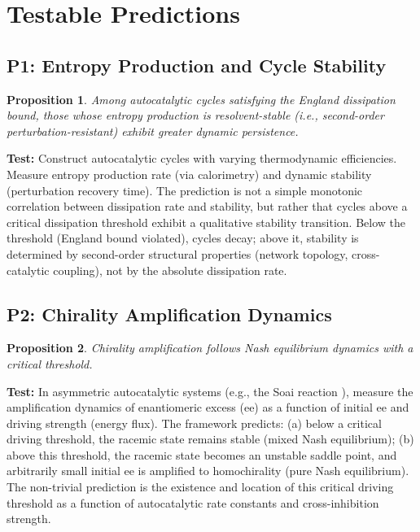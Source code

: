 \documentclass[12pt,a4paper]{article}
\newtheorem{proposition}{Proposition}
\theoremstyle{remark}
\begin{document}
\section{Testable Predictions}
\label{sec:predictions}

\subsection{P1: Entropy Production and Cycle Stability}

\begin{proposition}
Among autocatalytic cycles satisfying the England dissipation bound, those whose entropy production is resolvent-stable (i.e., second-order perturbation-resistant) exhibit greater dynamic persistence.
\end{proposition}

\textbf{Test:} Construct autocatalytic cycles with varying thermodynamic efficiencies. Measure entropy production rate (via calorimetry) and dynamic stability (perturbation recovery time). The prediction is not a simple monotonic correlation between dissipation rate and stability, but rather that cycles above a critical dissipation threshold exhibit a qualitative stability transition. Below the threshold (England bound violated), cycles decay; above it, stability is determined by second-order structural properties (network topology, cross-catalytic coupling), not by the absolute dissipation rate.

\subsection{P2: Chirality Amplification Dynamics}

\begin{proposition}
Chirality amplification follows Nash equilibrium dynamics with a critical threshold.
\end{proposition}

\textbf{Test:} In asymmetric autocatalytic systems (e.g., the Soai reaction \citep{Soai1995}), measure the amplification dynamics of enantiomeric excess (ee) as a function of initial ee and driving strength (energy flux). The framework predicts: (a) below a critical driving threshold, the racemic state remains stable (mixed Nash equilibrium); (b) above this threshold, the racemic state becomes an unstable saddle point, and arbitrarily small initial ee is amplified to homochirality (pure Nash equilibrium). The non-trivial prediction is the existence and location of this critical driving threshold as a function of autocatalytic rate constants and cross-inhibition strength.
\end{document}

